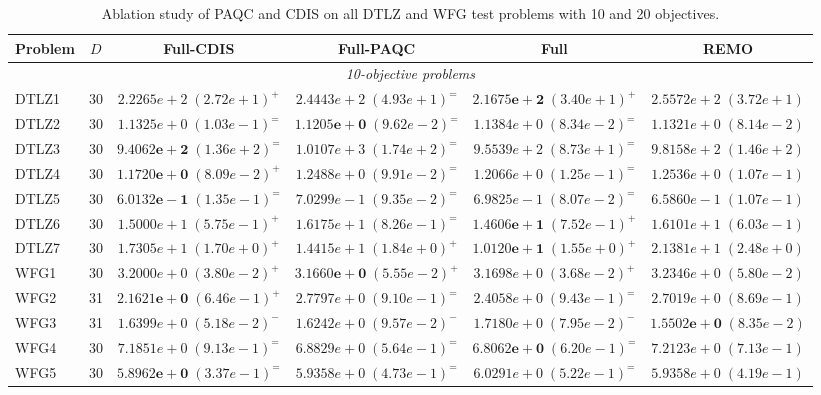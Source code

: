 \begin{table}[tp]
\centering
\caption{Ablation study of PAQC and CDIS on all DTLZ and WFG test problems with 10 and 20 objectives.}
\label{tab:exp:ablation}
\footnotesize
\setlength{\tabcolsep}{3.5pt}
\renewcommand{\arraystretch}{1.08}
\begin{tabular*}{\textwidth}{@{\extracolsep{\fill}}lccccc@{}}
\toprule
Problem & $D$ & Full-CDIS & Full-PAQC & Full & REMO \\
\midrule
\multicolumn{6}{c}{\textit{10-objective problems}} \\
\midrule
DTLZ1 & 30 & $2.2265e+2\;(2.72e+1)^{+}$ & $2.4443e+2\;(4.93e+1)^{=}$ & $\mathbf{2.1675e+2}\;(3.40e+1)^{+}$ & $2.5572e+2\;(3.72e+1)$ \\
DTLZ2 & 30 & $1.1325e+0\;(1.03e-1)^{=}$ & $\mathbf{1.1205e+0}\;(9.62e-2)^{=}$ & $1.1384e+0\;(8.34e-2)^{=}$ & $1.1321e+0\;(8.14e-2)$ \\
DTLZ3 & 30 & $\mathbf{9.4062e+2}\;(1.36e+2)^{=}$ & $1.0107e+3\;(1.74e+2)^{=}$ & $9.5539e+2\;(8.73e+1)^{=}$ & $9.8158e+2\;(1.46e+2)$ \\
DTLZ4 & 30 & $\mathbf{1.1720e+0}\;(8.09e-2)^{+}$ & $1.2488e+0\;(9.91e-2)^{=}$ & $1.2066e+0\;(1.25e-1)^{=}$ & $1.2536e+0\;(1.07e-1)$ \\
DTLZ5 & 30 & $\mathbf{6.0132e-1}\;(1.35e-1)^{=}$ & $7.0299e-1\;(9.35e-2)^{=}$ & $6.9825e-1\;(8.07e-2)^{=}$ & $6.5860e-1\;(1.07e-1)$ \\
DTLZ6 & 30 & $1.5000e+1\;(5.75e-1)^{+}$ & $1.6175e+1\;(8.26e-1)^{=}$ & $\mathbf{1.4606e+1}\;(7.52e-1)^{+}$ & $1.6101e+1\;(6.03e-1)$ \\
DTLZ7 & 30 & $1.7305e+1\;(1.70e+0)^{+}$ & $1.4415e+1\;(1.84e+0)^{+}$ & $\mathbf{1.0120e+1}\;(1.55e+0)^{+}$ & $2.1381e+1\;(2.48e+0)$ \\
WFG1 & 30 & $3.2000e+0\;(3.80e-2)^{+}$ & $\mathbf{3.1660e+0}\;(5.55e-2)^{+}$ & $3.1698e+0\;(3.68e-2)^{+}$ & $3.2346e+0\;(5.80e-2)$ \\
WFG2 & 31 & $\mathbf{2.1621e+0}\;(6.46e-1)^{+}$ & $2.7797e+0\;(9.10e-1)^{=}$ & $2.4058e+0\;(9.43e-1)^{=}$ & $2.7019e+0\;(8.69e-1)$ \\
WFG3 & 31 & $1.6399e+0\;(5.18e-2)^{-}$ & $1.6242e+0\;(9.57e-2)^{-}$ & $1.7180e+0\;(7.95e-2)^{-}$ & $\mathbf{1.5502e+0}\;(8.35e-2)$ \\
WFG4 & 30 & $7.1851e+0\;(9.13e-1)^{=}$ & $6.8829e+0\;(5.64e-1)^{=}$ & $\mathbf{6.8062e+0}\;(6.20e-1)^{=}$ & $7.2123e+0\;(7.13e-1)$ \\
WFG5 & 30 & $\mathbf{5.8962e+0}\;(3.37e-1)^{=}$ & $5.9358e+0\;(4.73e-1)^{=}$ & $6.0291e+0\;(5.22e-1)^{=}$ & $5.9358e+0\;(4.19e-1)$ \\

\end{tabular*}
\end{table}

